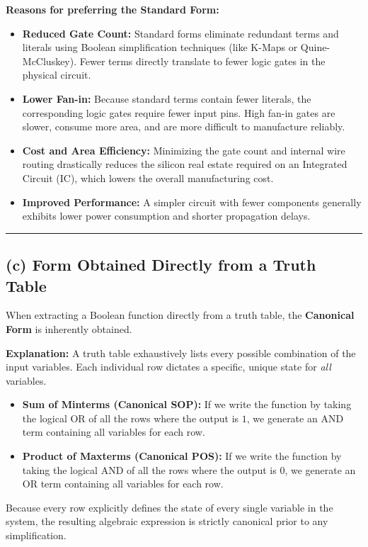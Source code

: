 \documentclass[12pt,a3paper]{article}
\begin{document}
\begin{enumerate}
\begin{tcolorbox}[enhanced,breakable,ansbox,colback=cB!4,colframe=cB,boxrule=0.8pt,arc=5pt,title={\textbf{Answer}},fonttitle=\bfseries\color{white},colbacktitle=cB]
\textbf{Reasons for preferring the Standard Form:}
\begin{itemize}
    \item \textbf{Reduced Gate Count:} Standard forms eliminate redundant terms and literals using Boolean simplification techniques (like K-Maps or Quine-McCluskey). Fewer terms directly translate to fewer logic gates in the physical circuit.
    \item \textbf{Lower Fan-in:} Because standard terms contain fewer literals, the corresponding logic gates require fewer input pins. High fan-in gates are slower, consume more area, and are more difficult to manufacture reliably.
    \item \textbf{Cost and Area Efficiency:} Minimizing the gate count and internal wire routing drastically reduces the silicon real estate required on an Integrated Circuit (IC), which lowers the overall manufacturing cost.
    \item \textbf{Improved Performance:} A simpler circuit with fewer components generally exhibits lower power consumption and shorter propagation delays.
\end{itemize}

\vspace{0.3cm}
\hrule
\vspace{0.3cm}

\subsection*{(c) Form Obtained Directly from a Truth Table}

When extracting a Boolean function directly from a truth table, the \textbf{\textcolor{cA}{Canonical Form}} is inherently obtained.

\textbf{Explanation:}
A truth table exhaustively lists every possible combination of the input variables. Each individual row dictates a specific, unique state for \textit{all} variables. 
\begin{itemize}
    \item \textbf{Sum of Minterms (Canonical SOP):} If we write the function by taking the logical OR of all the rows where the output is $1$, we generate an AND term containing all variables for each row.
    \item \textbf{Product of Maxterms (Canonical POS):} If we write the function by taking the logical AND of all the rows where the output is $0$, we generate an OR term containing all variables for each row.
\end{itemize}
Because every row explicitly defines the state of every single variable in the system, the resulting algebraic expression is strictly canonical prior to any simplification.

\end{tcolorbox}

\end{enumerate}
\end{document}
